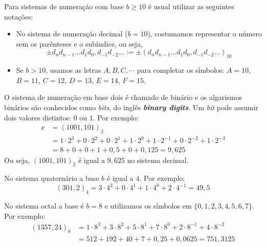 \begin{obs}[$b\geq 10$]\label{obs:sistema_de_numeracao}
Para sistemas de numeração com base $b \geq 10$ é usual utilizar as seguintes notações:
\begin{itemize}
\item No sistema de numeração decimal ($b=10$), costumamos representar o número sem os parênteses e o subíndice, ou seja,
\begin{equation*}
  \pm d_nd_{n-1}\ldots d_1d_0,d_{-1}d_{-2}\ldots := \pm (d_nd_{n-1}\ldots d_1d_0,d_{-1}d_{-2}\ldots)_{10}  
\end{equation*}
\item Se $b>10$, usamos as letras $A, B, C, \cdots$ para completar os símbolos: $A=10$, $B=11$, $C=12$, $D=13$, $E=14$, $F=15$.
\end{itemize}
\end{obs}


\begin{ex} O sistema de numeração em base dois é chamado de binário e os algarismos binários são conhecidos como \textit{bits}, do inglês \textit{\bf{b}inary dig\bf{its}}. Um \textit{bit} pode assumir dois valores distintos: $0$ ou $1$. Por exemplo:
\begin{equation*}
  \begin{split}
    x &= (1001,101)_{2} \\
    &= 1\cdot 2^3 +0\cdot 2^2 +0\cdot 2^1 +1\cdot 2^0  +1\cdot 2^{-1} +0\cdot 2^{-2} +1\cdot 2^{-3} \\
    &= 8+0+0+1+ 0,5+0+0,125 = 9,625    
  \end{split}
\end{equation*}
Ou seja, $(1001,101)_{2}$ é igual a $9,625$ no sistema decimal.
\end{ex}


\begin{ex}
No sistema quaternário a base $b$ é igual a $4$. Por exemplo:
  \begin{equation*}
    (301,2)_{4}=3\cdot 4^2+0\cdot 4^1+1\cdot 4^0+2\cdot 4^{-1}=49,5    
  \end{equation*}
\end{ex}

\begin{ex}
No sistema octal a base é $b=8$ e utilizamos os símbolos em $\{0, 1, 2, 3, 4, 5, 6, 7\}$. Por exemplo:
\begin{equation*}
  \begin{split}
    (1357,24)_{8}&= 1\cdot 8^3+3\cdot 8^2+5\cdot 8^1+7\cdot 8^{0}+2\cdot 8^{-1}+4\cdot 8^{-2}\\
    &= 512+192+40+7+0,25+0,0625=751,3125    
  \end{split}
\end{equation*}
\end{ex}

